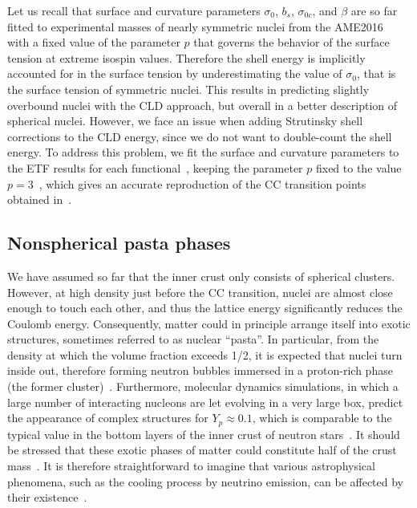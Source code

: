 Let us recall that surface and curvature parameters $\sigma_0$, $b_s$, 
$\sigma_{0c}$, and $\beta$ are so far fitted to experimental masses of nearly 
symmetric nuclei from the AME2016~\cite{Huang2017} with a fixed value of the
parameter $p$ that governs the behavior of the surface tension at extreme
isospin values. 
Therefore the shell energy is implicitly accounted for in the surface tension 
by underestimating the value of $\sigma_0$, that is the surface tension of symmetric 
nuclei. This results in predicting slightly overbound nuclei with the CLD
approach, but overall in a better description of spherical nuclei. 
However, we face an issue when adding Strutinsky shell corrections to
the CLD energy, since we do not want to double-count the shell energy. To
address this problem, we fit the surface and curvature parameters to the ETF 
results for each functional~\cite{PearsonPriv}, keeping the parameter $p$ fixed 
to the value $p=3$~\cite{Carreau2019}, which gives an accurate reproduction of 
the CC transition points obtained in~\cite{Pearson2019}.

\subsection{Nonspherical pasta phases}\label{subsec:pasta}

We have assumed so far that the inner crust only consists of spherical 
clusters. However, at high density just before the CC transition, 
nuclei are almost close enough to touch each other, and thus 
the lattice energy significantly reduces the Coulomb energy. Consequently,
matter could in principle arrange itself into exotic structures, sometimes
referred to as nuclear ``pasta''.
In particular, from the density at which the volume fraction exceeds 1/2, it is 
expected that nuclei turn inside out, therefore forming neutron bubbles 
immersed in a proton-rich phase (the former cluster)~\cite{BBP}. Furthermore, 
molecular dynamics simulations, in which a large number of 
interacting nucleons are let evolving in a very large box, predict the appearance of 
complex structures for $Y_p \approx 0.1$, which is comparable to the typical 
value in the bottom layers of the inner crust of neutron 
stars~\cite{Watanabe2003}. It should be stressed that these exotic phases of 
matter could constitute half of the crust mass~\cite{Lorenz1993}. It is
therefore straightforward to imagine that various astrophysical phenomena, such
as the cooling process by neutrino emission, can be affected by 
their existence~\cite{Watanabe2011}.

